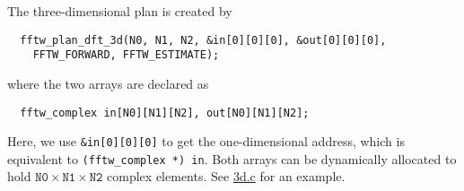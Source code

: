 \documentclass[12pt]{article}
\begin{document}
The three-dimensional plan is created by
\begin{verbatim}
  fftw_plan_dft_3d(N0, N1, N2, &in[0][0][0], &out[0][0][0],
    FFTW_FORWARD, FFTW_ESTIMATE);
\end{verbatim}
where the two arrays are declared as
\begin{verbatim}
  fftw_complex in[N0][N1][N2], out[N0][N1][N2];
\end{verbatim}
%
Here, we use
\texttt{\&in[0][0][0]}
to get the one-dimensional address,
which is equivalent to
\texttt{(fftw\_complex *) in}.
%
Both arrays can be dynamically allocated
to hold $\mathtt{N0} \times \mathtt{N1} \times \mathtt{N2}$
complex elements.
%
See \url{3d.c} for an example.
\end{document}
